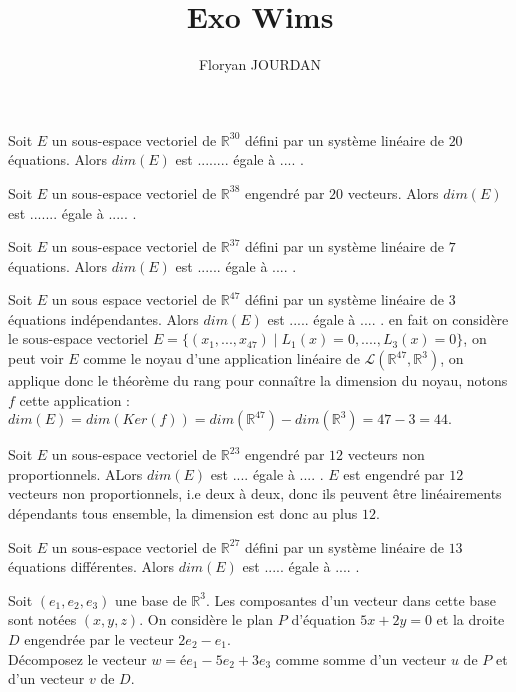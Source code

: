 \documentclass[12pt,a4paper]{article}
\title{Exo Wims}
\author{Floryan JOURDAN}
\newcommand{\RR}{\mathbb{R}}
\begin{document}
\begin{ExerciseList}
\maketitle
	\Exercise Soit $E$ un sous-espace vectoriel de $\RR^{30}$ défini par un système linéaire de $20$ équations. Alors $dim(E)$ est ........ égale à .... .

	\Exercise Soit $E$ un sous-espace vectoriel de $\RR^{38}$ engendré par $20$ vecteurs. Alors $dim(E)$ est ....... égale à ..... .

	\Exercise Soit $E$ un sous-espace vectoriel de $\RR^{37}$ défini par un système linéaire de $7$ équations. Alors $dim(E)$ est ...... égale à .... .
	
	\Exercise Soit $E$ un sous espace vectoriel de $\RR^{47}$ défini par un système linéaire de $3$ équations indépendantes. Alors $dim(E)$ est ..... égale à .... .
	\Answer en fait on considère le sous-espace vectoriel $E = \{(x_1,...,x_{47}) \mid L_1(x) = 0, ...., L_{3}(x) = 0 \}$, on peut voir $E$ comme le noyau d'une application linéaire de $\mathcal{L}(\RR^{47},\RR^3)$, on applique donc le théorème du rang pour connaître la dimension du noyau, notons $f$ cette application : $dim(E) = dim(Ker(f)) = dim(\RR^{47}) - dim(\RR^3) = 47 - 3 = 44.$ 
	
	\Exercise Soit $E$ un sous-espace vectoriel de $\RR^{23}$ engendré par $12$ vecteurs non proportionnels. ALors $dim(E)$ est .... égale à .... .
	\Answer $E$ est engendré par $12$ vecteurs non proportionnels, i.e deux à deux, donc ils peuvent être linéairements dépendants tous ensemble, la dimension est donc au plus $12$.

	\Exercise Soit $E$ un sous-espace vectoriel de $\RR^{27}$ défini par un système linéaire de $13$ équations différentes. Alors $dim(E)$ est ..... égale à .... .

	\Exercise Soit $(e_1,e_2,e_3)$ une base de $\RR^3$. Les composantes d'un vecteur dans cette base sont notées $(x,y,z)$. On considère le plan $P$ d'équation $5x+2y = 0$ et la droite $D$ engendrée par le vecteur $2e_2 - e_1$.\\
	Décomposez le vecteur $w = ée_1-5e_2+3e_3$ comme somme d'un vecteur $u$ de $P$ et d'un vecteur $v$ de $D$.


\end{ExerciseList}
\end{document}
